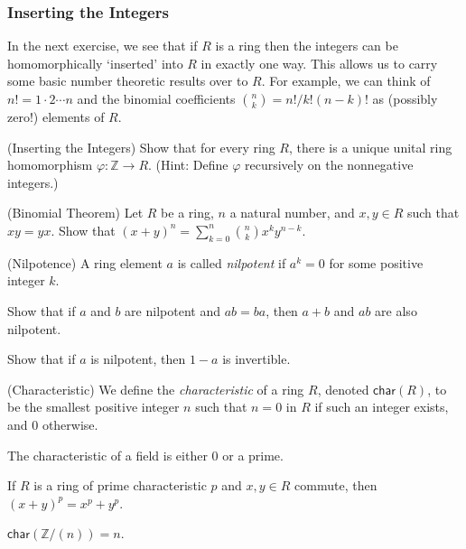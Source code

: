 \subsubsection*{Inserting the Integers}

In the next exercise, we see that if $R$ is a ring then the integers can be homomorphically `inserted' into $R$ in exactly one way. This allows us to carry some basic number theoretic results over to $R$. For example, we can think of $n! = 1 \cdot 2 \cdots n$ and the binomial coefficients ${n \choose k} = n!/k!(n-k)!$ as (possibly zero!) elements of $R$.

\begin{exercises}
\ResumeExercises
\item{\label{exr:inserting-zz}}
(Inserting the Integers) Show that for every ring $R$, there is a unique unital ring homomorphism $\varphi : \mathbb{Z} \rightarrow R$. (Hint: Define $\varphi$ recursively on the nonnegative integers.)

\item{\label{exr:binomial-thm}}%
(Binomial Theorem) Let $R$ be a ring, $n$ a natural number, and $x,y \in R$ such that $xy=yx$. Show that $(x+y)^n = \sum_{k=0}^n {n \choose k} x^ky^{n-k}$.

\item{\label{exr:nilpotence}}%
(Nilpotence) A ring element $a$ is called \emph{nilpotent} if $a^k = 0$ for some positive integer $k$. 
\begin{enumerate*}
\item Show that if $a$ and $b$ are nilpotent and $ab = ba$, then $a+b$ and $ab$ are also nilpotent.
\item Show that if $a$ is nilpotent, then $1-a$ is invertible.
\end{enumerate*}

\item{\label{exr:characteristic}}%
(Characteristic) We define the \emph{characteristic} of a ring $R$, denoted $\mathsf{char}(R)$, to be the smallest positive integer $n$ such that $n = 0$ in $R$ if such an integer exists, and 0 otherwise.
\begin{enumerate*}
\item The characteristic of a field is either 0 or a prime.
\item If $R$ is a ring of prime characteristic $p$ and $x,y \in R$ commute, then $(x+y)^p = x^p+y^p$.
\item $\mathsf{char}(\mathbb{Z}/(n)) = n$.
\end{enumerate*}
\PauseExercises
\end{exercises}

